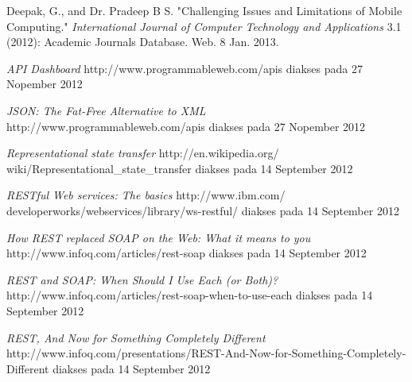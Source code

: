 \documentclass[a4paper, 12pt]{report}
\begin{document}
\begin{thebibliography}{99}
\singlespacing 


Deepak, G., and Dr. Pradeep B S. "Challenging Issues and Limitations of Mobile Computing." \emph{International Journal of Computer Technology and Applications} 3.1 (2012): Academic Journals Database. Web. 8 Jan. 2013.

  \emph{API Dashboard}
  http://www.programmableweb.com/apis
  diakses pada 27 Nopember 2012
  
  \emph{JSON: The Fat-Free Alternative to XML}
  http://www.programmableweb.com/apis
  diakses pada 27 Nopember 2012

  \emph{Representational state transfer}
  http://en.wikipedia.org/\\wiki/Representational\_state\_transfer
  diakses pada 14 September 2012 

  \emph{RESTful Web services: The basics}
  http://www.ibm.com/\\developerworks/webservices/library/ws-restful/
  diakses pada 14 September 2012
  
  \emph{How REST replaced SOAP on the Web: What it means to you}
  http://www.infoq.com/articles/rest-soap
  diakses pada 14 September 2012
  
  \emph{REST and SOAP: When Should I Use Each (or Both)?}
  http://www.infoq.com/articles/rest-soap-when-to-use-each
  diakses pada 14 September 2012
  
  \emph{REST, And Now for Something Completely Different}
  http://www.infoq.com/presentations/REST-And-Now-for-Something-Completely-Different
  diakses pada 14 September 2012
 
\end{thebibliography}
\end{document}
